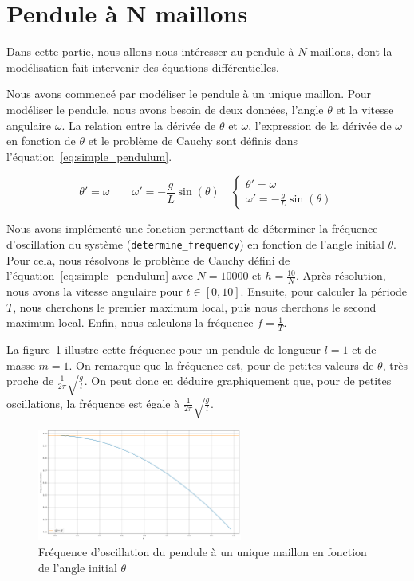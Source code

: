 \section*{Pendule à N maillons}

Dans cette partie, nous allons nous intéresser au pendule à $N$ maillons, dont la modélisation fait intervenir des équations différentielles.
\vskip 1mm ~

Nous avons commencé par modéliser le pendule à un unique maillon. 
Pour modéliser le pendule, nous avons besoin de deux données, l'angle $\theta$ et la vitesse angulaire $\omega$.
La relation entre la dérivée de $\theta$ et $\omega$, l'expression de la dérivée de $\omega$ en fonction de $\theta$ et le problème de Cauchy sont définis dans l'équation~\ref{eq:simple_pendulum}.

\begin{equation}
	\theta' = \omega \qquad \omega' = -\frac{g}{L}\sin(\theta) \quad
	\begin{cases}
		\theta' = \omega\\
		\omega' = -\frac{g}{L}\sin(\theta)
	\end{cases}
	\label{eq:simple_pendulum}
\end{equation}

Nous avons implémenté une fonction permettant de déterminer la fréquence d'oscillation du système (\verb|determine_frequency|) en fonction de l'angle initial $\theta$. Pour cela, nous résolvons 
le problème de Cauchy défini de l'équation~\ref{eq:simple_pendulum} avec $N=10000$ et $h = \frac{10}{N}$. Après résolution, nous avons la vitesse angulaire pour $t \in [0,10]$. Ensuite,
pour calculer la période $T$, nous cherchons le premier maximum local, puis nous cherchons le second maximum local. Enfin, nous calculons la fréquence $f = \frac{1}{T}$.

La figure~\ref{fig:frequency} illustre cette fréquence pour un pendule de longueur $l=1$ et de masse $m=1$. On remarque que la fréquence est, pour de petites valeurs de $\theta$, très proche de $\frac{1}{2\pi}\sqrt{\frac{g}{l}}$. On peut donc en déduire graphiquement que, pour de petites oscillations, la fréquence est égale à $\frac{1}{2\pi}\sqrt{\frac{g}{l}}$.

\begin{figure}[ht]
	\centering
	\includegraphics[width=0.6\textwidth]{img/frequency}
	\caption{Fréquence d'oscillation du pendule à un unique maillon en fonction de l'angle initial $\theta$}
	\label{fig:frequency}
\end{figure}

